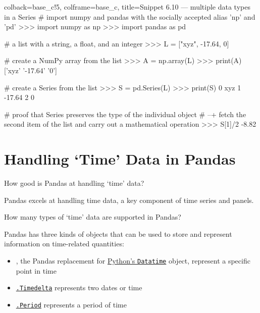 \documentclass[a4paper,11pt]{book}
\newcommand{\question}[1]{%
    \begin{tcolorbox}[colback=comp_c!10,colframe=comp_c,sidebyside align=top,width=\linewidth,before skip=1ex]
        #1
    \end{tcolorbox}
    \switchcolumn%
}
\newcommand{\note}[1]{%
    \begin{tcolorbox}[colback=white!0,colframe=white!10,width=\linewidth,before skip=1ex]
        #1
    \end{tcolorbox}
}
\begin{document}
\begin{pythoncode}[linenos=True]{colback=base_c!5, colframe=base_c, title=\sffamily Snippet 6.10 --- multiple data types in a Series}
# import numpy and pandas with the socially accepted alias 'np' and 'pd'
>>> import numpy as np
>>> import pandas as pd

# a list with a string, a float, and an integer
>>> L = ["xyz", -17.64, 0] 

# create a NumPy array from the list
>>> A = np.array(L)
>>> print(A)
['xyz' '-17.64' '0']

# create a Series from the list
>>> S = pd.Series(L)
>>> print(S)
0      xyz
1   -17.64
2        0

# proof that Series preserves the type of the individual object
# --+ fetch the second item of the list and carry out a mathematical operation
>>> S[1]/2
-8.82
\end{pythoncode}


\section{Handling `Time' Data in Pandas}

\begin{paracol}{2}
	\question{\raggedright How good is Pandas at handling `time' data?}
	\note{Pandas excels at handling time data, a key component of time series and panels.
	}
\end{paracol}

\begin{paracol}{2}
	\question{\raggedright How many types of `time' data are supported in Pandas?}
	\note{Pandas has three kinds of objects that can be used to store and represent information on time-related quantities:

	\begin{itemize}
		\item \href{https://pandas.pydata.org/docs/reference/api/pandas.Timestamp.html}{\textt{.Timestamp}}, the Pandas replacement for \href{https://docs.python.org/3/library/datetime.html}{Python's \texttt{Datatime}} object, represent a specific point in time 
		\item \href{https://pandas.pydata.org/docs/reference/api/pandas.Timedelta.html}{\texttt{.Timedelta}} represents two dates or time
		\item \href{https://pandas.pydata.org/docs/reference/api/pandas.Period.html}{\texttt{.Period}} represents a period of time
	\end{itemize}

	}
\end{paracol}
\clearpage
\end{document}
